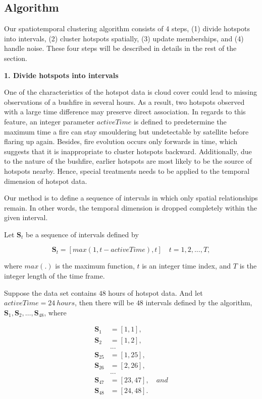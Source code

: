 \hypertarget{algorithm}{%
\subsection{Algorithm}\label{algorithm}}

Our spatiotemporal clustering algorithm consists of 4 steps, (1) divide
hotspots into intervals, (2) cluster hotspots spatially, (3) update
memberships, and (4) handle noise. These four steps will be described in
details in the rest of the section.

\textbf{1. Divide hotspots into intervals}

One of the characteristics of the hotspot data is cloud cover could lead
to missing observations of a bushfire in several hours. As a result, two
hotspots observed with a large time difference may preserve direct
association. In regards to this feature, an integer parameter
\(activeTime\) is defined to predetermine the maximum time a fire can
stay smouldering but undetectable by satellite before flaring up again.
Besides, fire evolution occurs only forwards in time, which suggests
that it is inappropriate to cluster hotspots backward. Additionally, due
to the nature of the bushfire, earlier hotspots are most likely to be
the source of hotspots nearby. Hence, special treatments needs to be
applied to the temporal dimension of hotspot data.

Our method is to define a sequence of intervals in which only spatial
relationships remain. In other words, the temporal dimension is dropped
completely within the given interval.

Let \(\boldsymbol{S}_t\) be a sequence of intervals defined by

\[\boldsymbol{S}_t = [max(1,t-activeTime),t]\quad t = 1,2,...,T,\]

where \(max(.)\) is the maximum function, \(t\) is an integer time
index, and \(T\) is the integer length of the time frame.

Suppose the data set contains \(48\) hours of hotspot data. And let
\(activeTime = 24~hours\), then there will be \(48\) intervals defined
by the algorithm,
\(\boldsymbol{S}_1,\boldsymbol{S}_2,\ldots,\boldsymbol{S}_{48}\), where

\begin{align*}
\boldsymbol{S}_1 &= [1,1],\\
\boldsymbol{S}_2 &= [1,2],\\
&...\\
\boldsymbol{S}_{25} &= [1,25],\\
\boldsymbol{S}_{26} &= [2,26],\\
&...\\
\boldsymbol{S}_{47} &= [23,47], \quad and\\
\boldsymbol{S}_{48} &= [24,48].
\end{align*}

